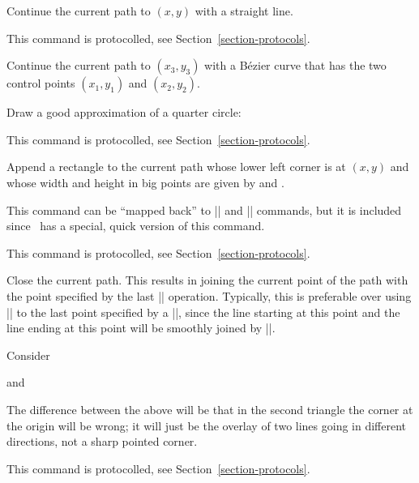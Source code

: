 \begin{command}{\pgfsys@lineto{}}
  Continue the current path to $(x,y)$ with
  a straight line.

  This command is protocolled, see Section~\ref{section-protocols}.
\end{command}


\begin{command}{\pgfsys@curveto{}}
  Continue the current path to $(x_3,y_3)$
  with a B\'ezier curve that has the two control points  $(x_1,y_1)$ and  $(x_2,y_2)$.

  \example Draw a good approximation of a quarter circle:
\begin{codeexample}
\pgfsys@moveto{10pt}{0pt}
\pgfsys@curveto{10pt}{5.55pt}{5.55pt}{10pt}{0pt}{10pt}
\pgfsys@stroke
\end{codeexample}

  This command is protocolled, see Section~\ref{section-protocols}.
\end{command}


\begin{command}{\pgfsys@rect{}}
  Append a rectangle to the current path whose lower left corner is
  at $(x,y)$ and whose width and height in
  big points are  given by  and .

  This command can be ``mapped back'' to |\pgfsys@moveto| and
  |\pgfsys@lineto| commands, but it is included since \pdf\ has a
  special, quick version of this command.

  This command is protocolled, see Section~\ref{section-protocols}.
\end{command}


\begin{command}{\pgfsys@closepath}
  Close the current path. This results in joining the current point of
  the path with the point specified by the last |\pgfsys@moveto|
  operation. Typically, this is preferable over using |\pgfsys@lineto|
  to the last point specified by a |\pgfsys@moveto|, since the line
  starting at this point and the line ending at this point will be
  smoothly joined by |\pgfsys@closepath|.

  \example Consider
\begin{codeexample}
\pgfsys@moveto{0pt}{0pt}
\pgfsys@lineto{10bp}{10bp}
\pgfsys@lineto{0bp}{10bp}
\pgfsys@closepath
\pgfsys@stroke
\end{codeexample}
  and
\begin{codeexample}
\pgfsys@moveto{0bp}{0bp}
\pgfsys@lineto{10bp}{10bp}
\pgfsys@lineto{0bp}{10bp}
\pgfsys@lineto{0bp}{0bp}
\pgfsys@stroke
\end{codeexample}

  The difference between the above will be that in the second triangle
  the corner at the origin will be wrong; it will just be the overlay
  of two lines going in different directions, not a sharp pointed
  corner.

  This command is protocolled, see Section~\ref{section-protocols}.
\end{command}




